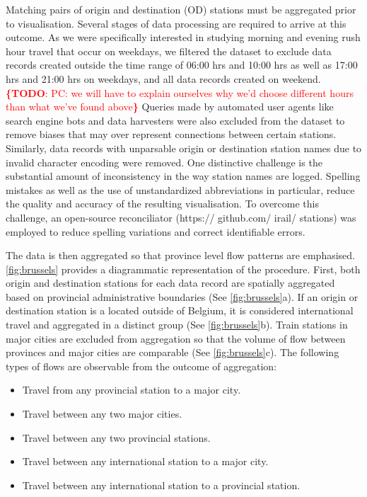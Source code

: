 \documentclass{sig-alternate}
\newcommand{\todo}[1]{\noindent\textcolor{red}{{\bf \{TODO}: #1{\bf \}}}}
\begin{document}
Matching pairs of origin and destination (OD) stations must be aggregated prior to visualisation.
Several stages of data processing are required to arrive at this outcome.
As we were specifically interested in studying morning and evening rush hour travel that occur on weekdays, we filtered the dataset to exclude data records created outside the time range of 06:00 hrs and 10:00 hrs as well as 17:00 hrs and 21:00 hrs on weekdays, and all data records created on weekend.
\todo{PC: we will have to explain ourselves why we'd choose different hours than what we've found above} 
Queries made by automated user agents like search engine bots and data harvesters were also excluded from the dataset to remove biases that may over represent connections between certain stations. 
Similarly, data records with unparsable origin or destination station names due to invalid character encoding were removed. 
One distinctive challenge is the substantial amount of inconsistency in the way station names are logged. 
Spelling mistakes as well as the use of unstandardized abbreviations in particular, reduce the quality and accuracy of the resulting visualisation.
To overcome this challenge, an open-source reconciliator (https:// github.com/ irail/ stations) was employed to reduce spelling variations and correct identifiable errors. 

The data is then aggregated so that province level flow patterns are emphasised.
\cref{fig:brussels} provides a diagrammatic representation of the procedure.
First, both origin and destination stations for each data record are spatially aggregated based on provincial administrative boundaries (See \cref{fig:brussels}a).
If an origin or destination station is a located outside of Belgium, it is considered international travel and aggregated in a distinct group (See \cref{fig:brussels}b).
Train stations in major cities are excluded from aggregation so that the volume of flow between provinces and major cities are comparable (See \cref{fig:brussels}c).
The following types of flows are observable from the outcome of aggregation:

\begin{itemize}
  \item Travel from any provincial station to a major city.
  \item Travel between any two major cities.
  \item Travel between any two provincial stations.
  \item Travel between any international station to a major city.
  \item Travel between any international station to a provincial station.
\end{itemize}
\end{document}
